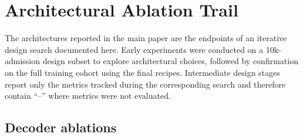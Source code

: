 \clearpage

\section{Architectural Ablation Trail}
\label{app:ablation-trail}

The architectures reported in the main paper are the endpoints of an iterative design search documented here. Early experiments were conducted on a 10k-admission design subset to explore architectural choices, followed by confirmation on the full training cohort using the final recipes. Intermediate design stages report only the metrics tracked during the corresponding search and therefore contain ``--'' where metrics were not evaluated.

\subsection{Decoder ablations}

